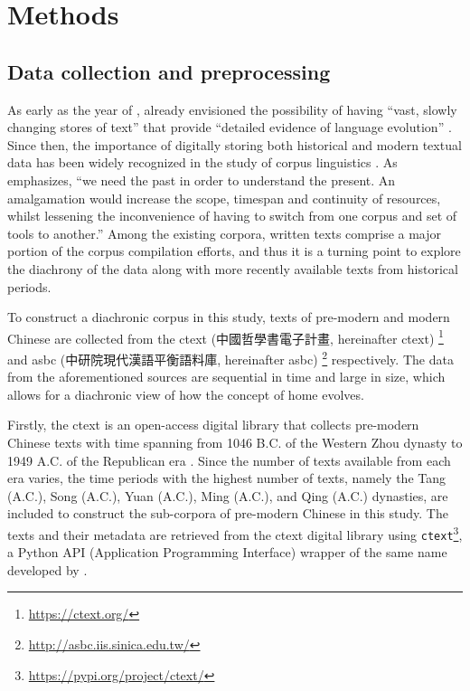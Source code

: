 

\chapter{Methods}
\label{methods}

\section{Data collection and preprocessing}
As early as the year of \citeyear{sinclair1982reflections}, \citeauthor{sinclair1982reflections} already envisioned the possibility of having ``vast, slowly changing stores of text'' that provide ``detailed evidence of language evolution'' . Since then, the importance of digitally storing both historical and modern textual data has been widely recognized in the study of corpus linguistics \parencite{renouf2002time}. As \textcite{renouf2002time} emphasizes, ``we need the past in order to understand the present. An amalgamation would increase the scope, timespan and continuity of resources, whilst lessening the inconvenience of having to switch from one corpus and set of tools to another.'' Among the existing corpora, written texts comprise a major portion of the corpus compilation efforts, and thus it is a turning point to explore the diachrony of the data along with more recently available texts from historical periods.


To construct a diachronic corpus in this study, texts of pre-modern and modern Chinese are collected from the \acrlong{ctext} (中國哲學書電子計畫, hereinafter \acrshort{ctext}) \parencite{sturgeon2019ctext}\footnote{\url{https://ctext.org/}} and \acrlong{asbc} (中研院現代漢語平衡語料庫, hereinafter \acrshort{asbc}) \parencite{chen1996sinica}\footnote{\url{http://asbc.iis.sinica.edu.tw/}} respectively. The data from the aforementioned sources are sequential in time and large in size, which allows for a diachronic view of how the concept of home evolves.

Firstly, the \acrlong{ctext} is an open-access digital library that collects pre-modern Chinese texts with time spanning from 1046 B.C. of the Western Zhou dynasty to 1949 A.C. of the Republican era \parencite{sturgeon2019ctext}. Since the number of texts available from each era varies, the time periods with the highest number of texts, namely the Tang (\tang\space A.C.), Song (\song\space A.C.), Yuan (\yuan\space A.C.), Ming (\ming\space A.C.), and Qing (\qing\space A.C.) dynasties, are included to construct the sub-corpora of pre-modern Chinese in this study. The texts and their metadata are retrieved from the \gls{ctext} digital library using \texttt{ctext}\footnote{\url{https://pypi.org/project/ctext/}}, a Python API (Application Programming Interface) wrapper of the same name developed by \textcite{ctextapi}.

